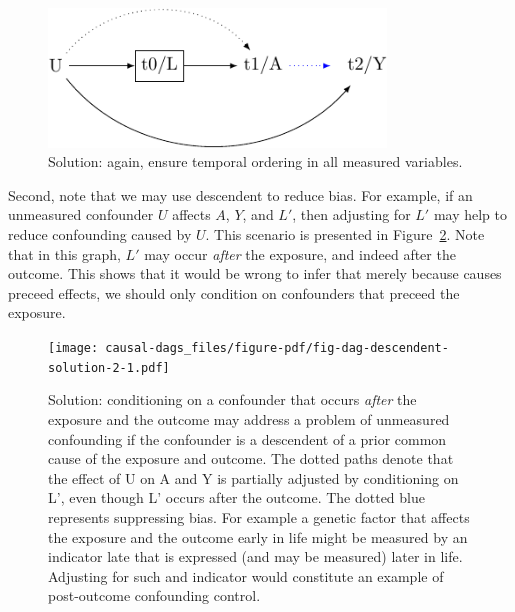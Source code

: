 \documentclass[
  singlecolumn]{report}
\begin{document}
\begin{figure}

{\centering \includegraphics[width=0.8\textwidth,height=\textheight]{causal-dags_files/figure-pdf/fig-dag-descendent-solution-1.pdf}

}

\caption{\label{fig-dag-descendent-solution}Solution: again, ensure
temporal ordering in all measured variables.}

\end{figure}

Second, note that we may use descendent to reduce bias. For example, if
an unmeasured confounder \(U\) affects \(A\), \(Y\), and \(L\prime\),
then adjusting for \(L\prime\) may help to reduce confounding caused by
\(U\). This scenario is presented in
Figure~\ref{fig-dag-descendent-solution-2}. Note that in this graph,
\(L\prime\) may occur \emph{after} the exposure, and indeed after the
outcome. This shows that it would be wrong to infer that merely because
causes preceed effects, we should only condition on confounders that
preceed the exposure.

\begin{figure}

{\centering \texttt{[image: causal-dags\_files/figure-pdf/fig-dag-descendent-solution-2-1.pdf]}

}

\caption{\label{fig-dag-descendent-solution-2}Solution: conditioning on
a confounder that occurs \emph{after} the exposure and the outcome may
address a problem of unmeasured confounding if the confounder is a
descendent of a prior common cause of the exposure and outcome. The
dotted paths denote that the effect of U on A and Y is partially
adjusted by conditioning on L', even though L' occurs after the outcome.
The dotted blue represents suppressing bias. For example a genetic
factor that affects the exposure and the outcome early in life might be
measured by an indicator late that is expressed (and may be measured)
later in life. Adjusting for such and indicator would constitute an
example of post-outcome confounding control.}

\end{figure}
\end{document}

